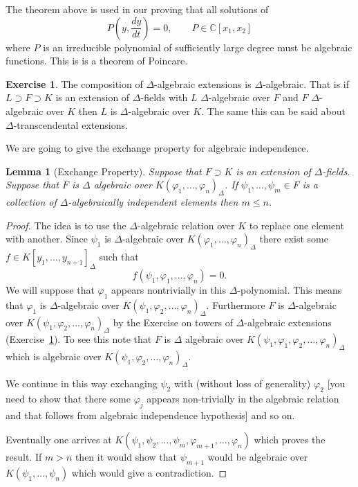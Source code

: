 \documentclass[12pt]{book}
\numberwithin{equation}{section}
\newtheorem{lemma}[theorem]{Lemma}
\theoremstyle{definition}
\newtheorem{exercise}[theorem]{Exercise}
\theoremstyle{remark}
\newcommand{\CC}{\mathbb{C}}
\begin{document}
The theorem above is used in our proving that all solutions of 
$$P(y,\dfrac{dy}{dt})=0, \qquad P \in \CC[x_1,x_2]$$ 
where $P$ is an irreducible polynomial of sufficiently large degree must be algebraic functions. 
This is is a theorem of Poincare.


\begin{exercise}\label{EX:algebraic-towers}
	The composition of $\Delta$-algebraic extensions is $\Delta$-algebraic. 
	That is if $L\supset F \supset K$ is an extension of $\Delta$-fields with $L$ $\Delta$-algebraic over $F$ and $F$ $\Delta$-algebraic over $K$ then $L$ is $\Delta$-algebraic over $K$. The same this can be said about $\Delta$-transcendental extensions.	
\end{exercise}

We are going to give the exchange property for algebraic independence. 
\begin{lemma}[Exchange Property]\label{L:exchange-property}
	Suppose that $F \supset K$ is an extension of $\Delta$-fields. 
	Suppose that $F$ is $\Delta$ algebraic over $K(\varphi_1,\ldots,\varphi_n)_{\Delta}$. 
	If $\psi_1,\ldots,\psi_m \in F$ is a collection of $\Delta$-algebraically independent elements then $m\leq n$. 
\end{lemma}
\begin{proof}
	The idea is to use the $\Delta$-algebraic relation over $K$ to replace one element with another.  
	Since $\psi_1$ is $\Delta$-algebraic over $K(\varphi_1,\ldots, \varphi_n)_{\Delta}$ there exist some $f \in K[y_1,\ldots,y_{n+1}]_{\Delta}$ such that 
	$$f(\psi_1,\varphi_1, \ldots, \varphi_n) =0.$$
	We will suppose that $\varphi_1$ appears nontrivially in this $\Delta$-polynomial.
	This means that $\varphi_1$ is $\Delta$-algebraic over $K(\psi_1,\varphi_2,\ldots,\varphi_n)_{\Delta}$. 
	Furthermore $F$ is $\Delta$-algebraic over $K(\psi_1,\varphi_2,\ldots,\varphi_n)_{\Delta}$ by the Exercise on towers of $\Delta$-algebraic extensions (Exercise~\ref{EX:algebraic-towers}).
	To see this note that $F$ is $\Delta$ algebraic over $K(\psi_1,\varphi_1,\varphi_2, \ldots,\varphi_n)_{\Delta}$ which is algebraic over $K(\psi_1,\varphi_2,\ldots,\varphi_n)_{\Delta}$. 
	
	We continue in this way exchanging $\psi_2$ with (without loss of generality) $\varphi_2$ [you need to show that there some $\varphi_j$ appears non-trivially in the algebraic relation and that follows from algebraic independence hypothesis] and so on. 
	
	Eventually one arrives at $K(\psi_1,\psi_2,\ldots,\psi_m, \varphi_{m+1},\ldots,\varphi_n)$ which proves the result. 
	If $m>n$ then it would show that $\psi_{m+1}$ would be algebraic over $K(\psi_1,\ldots,\psi_n)$ which would give a contradiction.
\end{proof}
\end{document}
